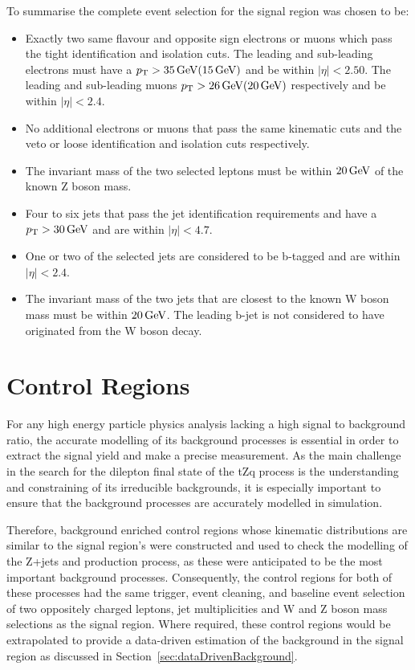 To summarise the complete event selection for the signal region was chosen to be:

\begin{itemize}
\item Exactly two same flavour and opposite sign electrons or muons which pass the tight identification and isolation cuts. The leading and sub-leading electrons must have a $p_{\mathrm{T}} > 35\,\text{Ge\hspace{-.08em}V} (15\,\text{Ge\hspace{-.08em}V})$ and be within $|\eta| < 2.50$. The leading and sub-leading muons $p_{\mathrm{T}} > 26\,\text{Ge\hspace{-.08em}V} (20\,\text{Ge\hspace{-.08em}V})$ respectively and be within $|\eta| < 2.4$.
\item  No additional electrons or muons that pass the same kinematic cuts and the veto or loose identification and isolation cuts respectively. 
\item The invariant mass of the two selected leptons must be within $20\,\text{Ge\hspace{-.08em}V}$ of the known Z boson mass.
\item Four to six jets that pass the jet identification requirements and have a $p_{\mathrm{T}} > 30\,\text{Ge\hspace{-.08em}V}$ and are within $|\eta| < 4.7$.
\item One or two of the selected jets are considered to be b-tagged and are within $|\eta| < 2.4$.
\item The invariant mass of the two jets that are closest to the known W boson mass must be within $20\,\text{Ge\hspace{-.08em}V}$. The leading b-jet is not considered to have originated from the W boson decay.
\end{itemize}

\section{Control Regions}\label{sec:controlRegions}
For any high energy particle physics analysis lacking a high signal to background ratio, the accurate modelling of its background processes is essential in order to extract the signal yield and make a precise measurement.
As the main challenge in the search for the dilepton final state of the tZq process is the understanding and constraining of its irreducible backgrounds, it is especially important to ensure that the background processes are accurately modelled in simulation.

Therefore, background enriched control regions whose kinematic distributions are similar to the signal region's were constructed and used to check the modelling of the Z+jets and \ttbar production process, as these were anticipated to be the most important background processes.	
Consequently, the control regions for both of these processes had the same trigger, event cleaning, and baseline event selection of two oppositely charged leptons, jet multiplicities and W and Z boson mass selections as the signal region.
Where required, these control regions would be extrapolated to provide a data-driven estimation of the background in the signal region as discussed in Section~\ref{sec:dataDrivenBackground}.

